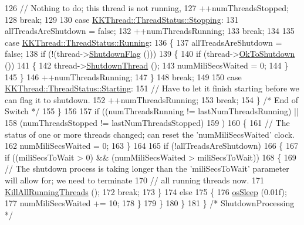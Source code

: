 \begin{DoxyCode}
126         \textcolor{comment}{// Nothing to do;  this thread is not running,}
127         ++numThreadsStopped;
128         \textcolor{keywordflow}{break};
129 
130       \textcolor{keywordflow}{case}  \hyperlink{class_k_k_b_1_1_k_k_thread_a3f72bb1988ae5dd353b39260ae0acc72a7b7ecb39b9e110c2a31409a1672bad23}{KKThread::ThreadStatus::Stopping}:
131         allTreadsAreShutdown = \textcolor{keyword}{false};
132         ++numThreadsRunning;
133         \textcolor{keywordflow}{break};
134 
135       \textcolor{keywordflow}{case}  \hyperlink{class_k_k_b_1_1_k_k_thread_a3f72bb1988ae5dd353b39260ae0acc72a5bda814c4aedb126839228f1a3d92f09}{KKThread::ThreadStatus::Running}:
136         \{
137           allTreadsAreShutdown = \textcolor{keyword}{false};
138           \textcolor{keywordflow}{if}  (!(thread->\hyperlink{class_k_k_b_1_1_k_k_thread_a271dba95d3432cf7ea4992951f2b2a38}{ShutdownFlag} ()))
139           \{
140             \textcolor{keywordflow}{if}  (thread->\hyperlink{class_k_k_b_1_1_k_k_thread_a7aa56da8a1a30568b4b7c353909e6b4c}{OkToShutdown} ())
141             \{
142               thread->\hyperlink{class_k_k_b_1_1_k_k_thread_af3d38a6013474f4710c1797fbf26d3cb}{ShutdownThread} ();
143               numMiliSecsWaited = 0;
144             \}
145           \}
146           ++numThreadsRunning;
147         \}
148         \textcolor{keywordflow}{break};
149 
150       \textcolor{keywordflow}{case}  \hyperlink{class_k_k_b_1_1_k_k_thread_a3f72bb1988ae5dd353b39260ae0acc72ac2efe4bbd13e6cb0db293e72884273c0}{KKThread::ThreadStatus::Starting}:
151         \textcolor{comment}{// Have to let it finish starting before we can flag it to shutdown.}
152         ++numThreadsRunning;
153         \textcolor{keywordflow}{break};
154       \}  \textcolor{comment}{/* End of Switch */}
155     \}
156 
157     \textcolor{keywordflow}{if}  ((numThreadsRunning != lastNumThreadsRunning)  ||
158          (numThreadsStopped != lastNumThreadsStopped)
159         )
160     \{
161       \textcolor{comment}{// The status of one or more threads changed;  can reset the 'numMiliSecsWaited' clock.}
162       numMiliSecsWaited = 0;
163     \}
164 
165     \textcolor{keywordflow}{if}  (!allTreadsAreShutdown)
166     \{
167       \textcolor{keywordflow}{if}  ((miliSecsToWait > 0)  &&  (numMiliSecsWaited > miliSecsToWait))
168       \{
169         \textcolor{comment}{// The shutdown process is taking longer than the 'miliSecsToWait' parameter will allow for;  we
       need to terminate}
170         \textcolor{comment}{// all running threads now.}
171         \hyperlink{class_k_k_b_1_1_k_k_thread_manager_a21bbabcebe4b2bb75eedacf1687c2a1b}{KillAllRunningThreads} ();
172         \textcolor{keywordflow}{break};
173       \}
174       \textcolor{keywordflow}{else}
175       \{
176         \hyperlink{namespace_k_k_b_a1a3717b963b0813e96b66d1953fce1af}{osSleep} (0.01f);
177         numMiliSecsWaited += 10;
178       \}
179     \}
180   \}
181 \}  \textcolor{comment}{/* ShutdownProcessing */}
\end{DoxyCode}
